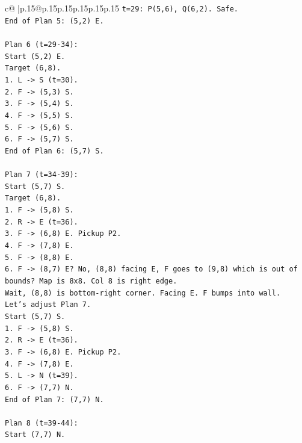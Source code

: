 \documentclass{article}
\begin{document}
{\begin{supertabular}{c@{$\;$}|p{.15\linewidth}@{}p{.15\linewidth}p{.15\linewidth}p{.15\linewidth}p{.15\linewidth}p{.15\linewidth}}
{{{\texttt{t=29: P(5,6), Q(6,2). Safe.} \\
\texttt{End of Plan 5: (5,2) E.} \\
\\ 
\texttt{Plan 6 (t=29{-}34):} \\
\texttt{Start (5,2) E.} \\
\texttt{Target (6,8).} \\
\texttt{1. L {-}> S (t=30).} \\
\texttt{2. F {-}> (5,3) S.} \\
\texttt{3. F {-}> (5,4) S.} \\
\texttt{4. F {-}> (5,5) S.} \\
\texttt{5. F {-}> (5,6) S.} \\
\texttt{6. F {-}> (5,7) S.} \\
\texttt{End of Plan 6: (5,7) S.} \\
\\ 
\texttt{Plan 7 (t=34{-}39):} \\
\texttt{Start (5,7) S.} \\
\texttt{Target (6,8).} \\
\texttt{1. F {-}> (5,8) S.} \\
\texttt{2. R {-}> E (t=36).} \\
\texttt{3. F {-}> (6,8) E. Pickup P2.} \\
\texttt{4. F {-}> (7,8) E.} \\
\texttt{5. F {-}> (8,8) E.} \\
\texttt{6. F {-}> (8,7) E? No, (8,8) facing E, F goes to (9,8) which is out of bounds? Map is 8x8. Col 8 is right edge.} \\
\texttt{Wait, (8,8) is bottom{-}right corner. Facing E. F bumps into wall.} \\
\texttt{Let's adjust Plan 7.} \\
\texttt{Start (5,7) S.} \\
\texttt{1. F {-}> (5,8) S.} \\
\texttt{2. R {-}> E (t=36).} \\
\texttt{3. F {-}> (6,8) E. Pickup P2.} \\
\texttt{4. F {-}> (7,8) E.} \\
\texttt{5. L {-}> N (t=39).} \\
\texttt{6. F {-}> (7,7) N.} \\
\texttt{End of Plan 7: (7,7) N.} \\
\\ 
\texttt{Plan 8 (t=39{-}44):} \\
\texttt{Start (7,7) N.} \\
}}}
\end{supertabular}}
\end{document}
